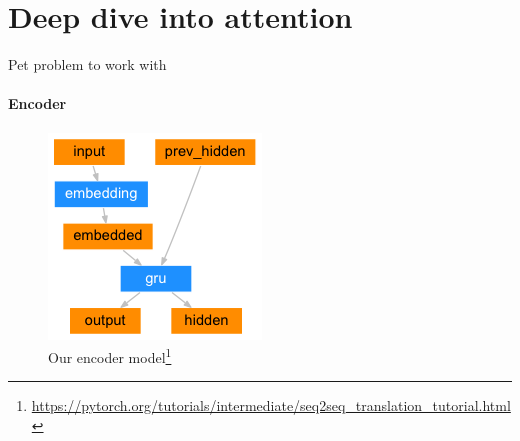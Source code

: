 \documentclass{beamer}
\begin{document}
\section{Deep dive into attention}


\begin{frame}{Pet problem to work with}
\framesubtitle{Encoder}
    \begin{figure}
    \includegraphics[width = .4\textwidth]{images/encoder-network.png}
    \caption{Our encoder model\footnote{\url{https://pytorch.org/tutorials/intermediate/seq2seq_translation_tutorial.html}}}
\end{figure}{}
\end{frame}
\end{document}
